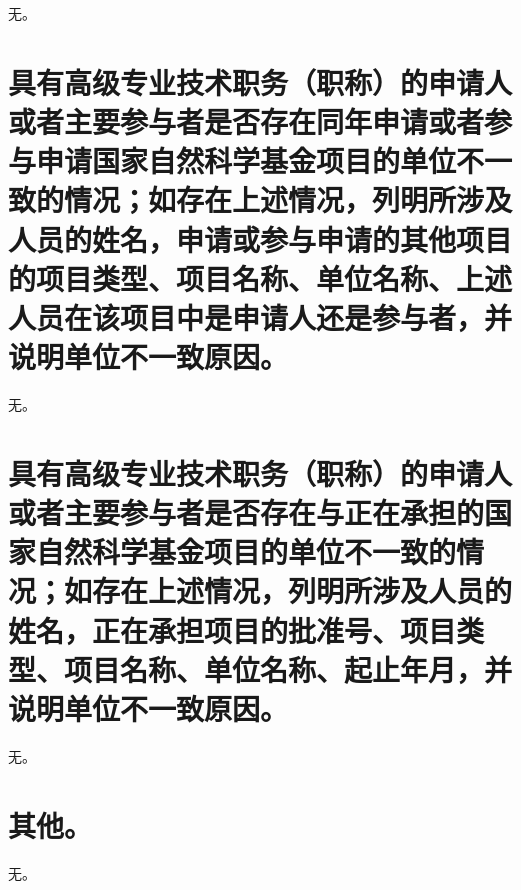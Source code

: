 \documentclass{nsfc}
\begin{document}
无。

\section{具有高级专业技术职务（职称）的申请人或者主要参与者是否存在同年申请或者参与申请国家自然科学基金项目的单位不一致的情况；如存在上述情况，列明所涉及人员的姓名，申请或参与申请的其他项目的项目类型、项目名称、单位名称、上述人员在该项目中是申请人还是参与者，并说明单位不一致原因。}

无。

\section{ 具有高级专业技术职务（职称）的申请人或者主要参与者是否存在与正在承担的国家自然科学基金项目的单位不一致的情况；如存在上述情况，列明所涉及人员的姓名，正在承担项目的批准号、项目类型、项目名称、单位名称、起止年月，并说明单位不一致原因。}

无。

\section{其他。}

无。
\end{document}

